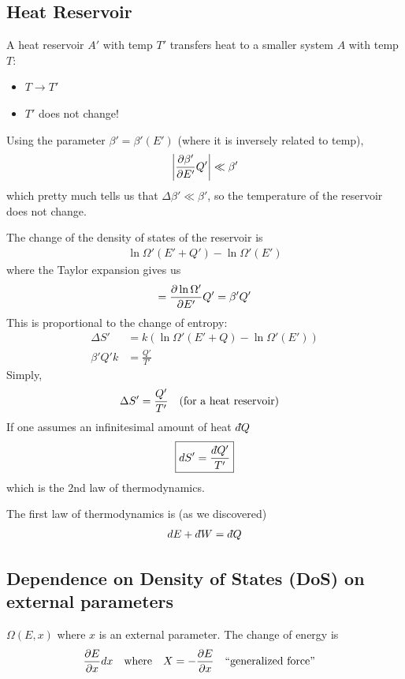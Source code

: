 \documentclass[../main.tex]{subfiles}
\begin{document}
\subsection{Heat Reservoir}

A heat reservoir $A'$ with temp $T'$ transfers heat to a smaller system $A$ with temp $T$:
\begin{itemize}
    \item $T \to T'$
    \item $T'$ does not change!
\end{itemize}
Using the parameter $\beta' = \beta'(E')$ (where it is inversely related to temp), 
\begin{align*}
    \abs{\pdv{\beta'}{E'} Q'} \ll \beta'
\end{align*}
which pretty much tells us that $\Delta \beta' \ll \beta'$, so the temperature of the reservoir does not change.

The change of the density of states of the reservoir is
\begin{align*}
    \ln\Omega'(E' + Q') - \ln\Omega'(E') 
\end{align*}
where the Taylor expansion gives us
\begin{align*}
    = \pdv{\ln\Omega'}{E'} Q' = \beta' Q'
\end{align*}
This is proportional to the change of entropy:
\begin{align*}
    \Delta S' &= k(\ln\Omega'(E' + Q) - \ln\Omega'(E')) \\
    \beta'Q'k &= \frac{Q'}{T'}
\end{align*}
Simply,
\begin{align*}
    \Delta S' = \frac{Q'}{T'} \qqtext{(for a heat reservoir)}
\end{align*}
If one assumes an infinitesimal amount of heat $d\hspace*{-0.08em}\bar{}\hspace*{0.1em} Q$
\begin{align*}
    \boxed{d S' = \frac{d\hspace*{-0.08em}\bar{}\hspace*{0.1em} Q'}{T'}}
\end{align*}
which is the 2nd law of thermodynamics.

The first law of thermodynamics is (as we discovered)
\begin{align*}
    d E + d\hspace*{-0.08em}\bar{}\hspace*{0.1em} W = d\hspace*{-0.08em}\bar{}\hspace*{0.1em} Q
\end{align*}

\subsection{Dependence on Density of States (DoS) on external parameters}

$\Omega(E, x)$ where $x$ is an external parameter. The change of energy is
\begin{align*}
    \pdv{E}{x} dx \qqtext{where} X = -\pdv{E}{x} \qqtext{``generalized force''}
\end{align*}
\end{document}
